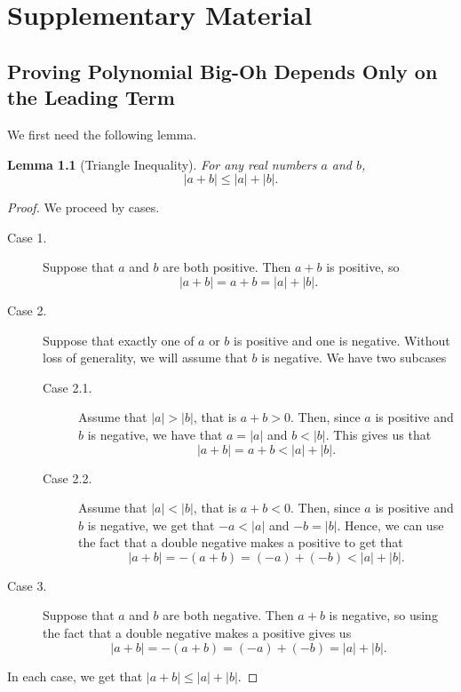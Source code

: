 \documentclass[11pt,oneside]{book}
\newtheorem{lem}[thm]{Lemma}
\theoremstyle{definition}
\begin{document}
\appendix
\chapter{Supplementary Material}
\section{Proving Polynomial Big-Oh Depends Only on the Leading Term} \label{appendix:PolynomialBig-Oh}
We first need the following lemma.

\begin{lem}[Triangle Inequality] \label{lem:TriangleInequality}
    For any real numbers $a$ and $b$,
    \[ |a + b| \leq |a| + |b|. \]
\end{lem}
\begin{proof}
    We proceed by cases.
    \begin{description}
        \item[Case 1.] Suppose that $a$ and $b$ are both positive.
        Then $a + b$ is positive, so
        \[ |a + b| = a + b = |a| + |b|. \]

        \item[Case 2.] Suppose that exactly one of $a$ or $b$ is positive and one is negative.
        Without loss of generality, we will assume that $b$ is negative.
        We have two subcases
        \begin{description}
            \item[Case 2.1.] Assume that $|a| > |b|$, that is $a + b > 0$.
            Then, since $a$ is positive and $b$ is negative, we have that $a = |a|$ and $b < |b|$.
            This gives us that
            \[ |a + b| = a + b < |a| + |b|. \]

            \item[Case 2.2.] Assume that $|a| < |b|$, that is $a + b < 0$.
            Then, since $a$ is positive and $b$ is negative, we get that $-a < |a|$ and $-b = |b|$.
            Hence, we can use the fact that a double negative makes a positive to get that
            \[ |a + b| = -(a + b) = (-a) + (-b) < |a| + |b|. \]
        \end{description}

        \item[Case 3.] Suppose that $a$ and $b$ are both negative.
        Then $a + b$ is negative, so using the fact that a double negative makes a positive gives us
        \[ |a + b| = -(a + b) = (-a) + (-b) = |a| + |b|. \]

    \end{description}
    In each case, we get that $|a + b| \leq |a| + |b|$.
\end{proof}
\end{document}
